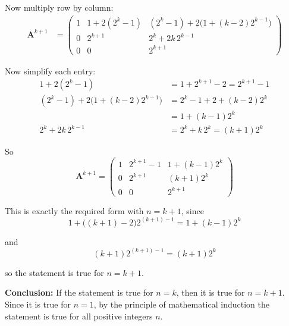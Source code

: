 \documentclass[leqno]{article}
\begin{document}
\begin{enumerate}[
  label=\textbf{\arabic*.},
  leftmargin=*,
  topsep=0pt,
  partopsep=0pt,
  parsep=0pt
]
\begin{djsSolution}
Now multiply row by column:
\begin{align*}
\mathbf{A}^{k+1}
&=
\begin{pmatrix}
1 &
1+2(2^k-1) &
(2^k-1)+2\bigl(1+(k-2)2^{k-1}\bigr) \\
0 &
2^{k+1} &
2^k+2k\,2^{k-1} \\
0 &
0 &
2^{k+1}
\end{pmatrix}
\end{align*}

Now simplify each entry:
\begin{align*}
1+2(2^k-1) &= 1+2^{k+1}-2 = 2^{k+1}-1 \\
(2^k-1)+2\bigl(1+(k-2)2^{k-1}\bigr)
&= 2^k-1+2+(k-2)2^k \\
&= 1+(k-1)2^k \\
2^k+2k\,2^{k-1} &= 2^k+k\,2^k=(k+1)2^k
\end{align*}

So
\[
\mathbf{A}^{k+1}=
\begin{pmatrix}
1 & 2^{k+1}-1 & 1+(k-1)2^k \\
0 & 2^{k+1} & (k+1)2^k \\
0 & 0 & 2^{k+1}
\end{pmatrix}
\]

This is exactly the required form with $n=k+1$, since
\[
1+\bigl((k+1)-2\bigr)2^{(k+1)-1}=1+(k-1)2^k
\]

and
\[
(k+1)2^{(k+1)-1}=(k+1)2^k
\]

so the statement is true for $n=k+1$.

\textbf{Conclusion:} If the statement is true for $n=k$, then it is true for $n=k+1$. Since it is true for $n=1$, by the principle of mathematical induction the statement is true for all positive integers $n$.
\end{djsSolution}


\end{enumerate}
\end{document}
